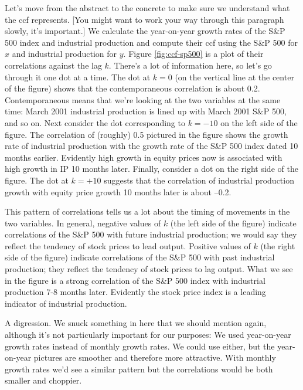 \documentclass[letterpaper,12pt]{article}
\begin{document}
Let's move from the abstract to the concrete to make sure we
understand what the ccf represents.
[You might want to work your way through this paragraph slowly,
it's important.]
We calculate the year-on-year growth rates of the S\&P 500 index
and industrial production and compute their ccf using
the S\&P 500 for $x$ and industrial production for $y$.
Figure \ref{fig:ccf-sp500} is a plot of their correlations against
the lag $k$.
There's a lot of information here, so let's go through it
one dot at a time.
The dot at $k=0$ (on the vertical line at the center of the figure)
shows that the contemporaneous correlation is about 0.2.
Contemporaneous means that we're looking at the two variables
at the same time:
March 2001 industrial production is lined up with March 2001 S\&P 500,
and so on.
Next consider the dot corresponding to $ k = -10$ on the left
side of the figure.
The correlation of (roughly) 0.5 pictured in the figure
shows the growth rate of industrial production with
the growth rate of the S\&P 500 index dated
10 months earlier.
Evidently high growth in equity prices now
is associated with high growth in IP 10 months later.
Finally, consider a dot on the right side of the figure.
The dot at $k=+10$ suggests that the correlation
of industrial production growth with equity price growth 10 months
later is about --0.2.

This pattern of correlations tells us a lot about the
timing of movements in the two variables.
In general, negative values of $k$ (the left side of the figure)
indicate correlations of the S\&P 500 with
future industrial production; we would say they reflect the tendency
of stock prices to lead output.
Positive values of $k$ (the right side of the figure)
indicate correlations of the S\&P 500 with
past industrial production; they reflect
the tendency of stock prices to lag output.
What we see in the figure is a strong correlation of the S\&P 500 index
with industrial production 7-8 months later.
Evidently the stock price index is a leading indicator of
industrial production.

A digression.  We snuck something in here that we
should mention again,
although it's not particularly important for our purposes:
We used year-on-year growth rates instead of monthly
growth rates.
We could use either, but the year-on-year pictures are smoother
and therefore more attractive.
With monthly growth rates we'd see a similar pattern
but the correlations would be both smaller and choppier.
\end{document}

